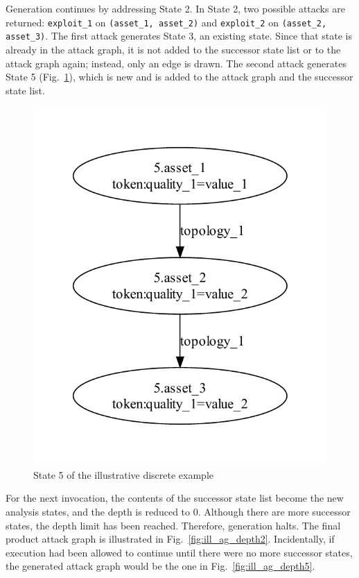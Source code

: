 Generation continues by addressing State 2. In State 2, two possible attacks
are returned: \texttt{exploit\_1} on \texttt{(asset\_1, asset\_2)} and 
\texttt{exploit\_2} on \texttt{(asset\_2, asset\_3)}. The first attack generates State 3,
an existing state. Since that state is already in the attack graph, it is
not added to the successor state list or to the attack graph again; instead,
only an edge is drawn. The second attack generates State 5 
(Fig.~\ref{fig:ill_topology_5}), which is new and is added to the attack graph
and the successor state list.

\begin{figure}
\centering
\includegraphics[height=0.4\textheight]{ag_illustrative_simple/nm_state5}
\caption{State 5 of the illustrative discrete example}
\label{fig:ill_topology_5}
\end{figure}

For the next invocation, the contents of the successor state list become the new
analysis states, and the depth is reduced to 0.  Although there are more successor states,
the depth limit has been reached. Therefore, generation halts. The final product
attack graph is illustrated in Fig.~\ref{fig:ill_ag_depth2}. Incidentally, if
execution had been allowed to continue until there were no more successor states,
the generated attack graph would be the one in Fig.~\ref{fig:ill_ag_depth5}.

